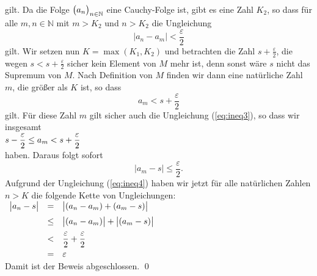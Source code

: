 gilt.  
Da die Folge $\bigl(a_n\bigr)_{n\in\mathbb{N}}$ eine Cauchy-Folge ist, gibt es eine Zahl $K_2$, so dass
f\"ur alle $m,n\in\mathbb{N}$ mit $m>K_2$ und $n>K_2$ die Ungleichung
\begin{equation}
  \label{eq:ineq4}
  \bigl| a_n - a_m \bigr| < \frac{\varepsilon}{2}
\end{equation}
gilt.  Wir setzen nun $K = \max(K_1,K_2)$ und betrachten die Zahl
$s+\frac{\varepsilon}{2}$, die wegen 
$s < s+\frac{\varepsilon}{2}$ sicher kein Element von $M$ mehr ist, denn sonst w\"are $s$ nicht das
Supremum von $M$.
Nach Definition von $M$ finden wir
dann eine nat\"urliche Zahl $m$, die gr\"o\ss{}er als $K$ ist, so dass
\begin{equation}
  \label{eq:ineq5}
  a_m < s + \frac{\varepsilon}{2} 
\end{equation}
gilt.  F\"ur diese Zahl $m$ gilt sicher auch die Ungleichung (\ref{eq:ineq3}), so dass wir
insgesamt
\\[0.2cm]
\hspace*{1.3cm}
$\displaystyle s - \frac{\varepsilon}{2} \leq a_m < s + \frac{\varepsilon}{2} $
\\[0.2cm]
haben.  Daraus folgt sofort
\begin{equation}
  \label{eq:ineq6}
 \bigl| a_m - s \bigr| \leq \frac{\varepsilon}{2}.  
\end{equation}
Aufgrund der Ungleichung (\ref{eq:ineq4}) haben wir jetzt f\"ur alle nat\"urlichen Zahlen
$n>K$ die folgende Kette von Ungleichungen:
\\[0.2cm]
\hspace*{1.3cm}
$
\begin{array}{lcl}
  \bigl| a_n - s \bigr| &   =  & \bigl| (a_n - a_m) + (a_m - s) \bigr| \\[0.2cm] 
                        & \leq & \bigl| (a_n - a_m) \bigr| + \bigl| (a_m - s) \bigr| \\[0.2cm] 
                        &  <   & \displaystyle\frac{\varepsilon}{2} + \frac{\varepsilon}{2}  \\[0.2cm] 
                        &  =   & \varepsilon  
\end{array}
$
\\[0.2cm]
Damit ist der Beweis abgeschlossen. \qed 



